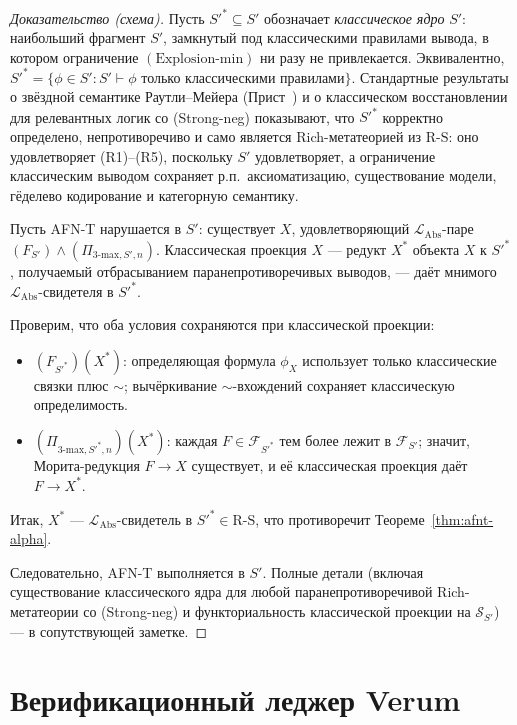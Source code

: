 \documentclass[11pt]{article}
\theoremstyle{plain}
\theoremstyle{definition}
\newcommand{\RS}{\mathrm{R\text{-}S}}
\newcommand{\cS}{\mathcal{S}}
\newcommand{\cF}{\mathcal{F}}
\newcommand{\LAbs}{\mathcal{L}_{\mathrm{Abs}}}
\begin{document}
\begin{proof}[Доказательство (схема)]

Пусть $S'^* \subseteq S'$ обозначает \emph{классическое ядро} $S'$: наибольший фрагмент $S'$, замкнутый под классическими правилами вывода, в котором ограничение $(\text{Explosion-min})$ ни разу не привлекается. Эквивалентно, $S'^* = \{\phi \in S' : S' \vdash \phi \text{ только классическими правилами}\}$. Стандартные результаты о звёздной семантике Раутли--Мейера (Прист~\cite{Priest2006}) и о классическом восстановлении для релевантных логик со (Strong-neg) показывают, что $S'^*$ корректно определено, непротиворечиво и само является Rich-метатеорией из $\RS$: оно удовлетворяет (R1)--(R5), поскольку $S'$ удовлетворяет, а ограничение классическим выводом сохраняет р.п.\ аксиоматизацию, существование модели, гёделево кодирование и категорную семантику.

Пусть AFN-T нарушается в $S'$: существует $X$, удовлетворяющий $\LAbs$-паре $(F_{S'}) \wedge (\Pi_{3\text{-max}, S', n})$. Классическая проекция $X$ --- редукт $X^*$ объекта $X$ к $S'^*$, получаемый отбрасыванием паранепротиворечивых выводов, --- даёт мнимого $\LAbs$-свидетеля в $S'^*$.

Проверим, что оба условия сохраняются при классической проекции:
\begin{itemize}
\item $(F_{S'^*})(X^*)$: определяющая формула $\phi_X$ использует только классические связки плюс $\sim$; вычёркивание $\sim$-вхождений сохраняет классическую определимость.
\item $(\Pi_{3\text{-max}, S'^*, n})(X^*)$: каждая $F \in \cF_{S'^*}$ тем более лежит в $\cF_{S'}$; значит, Морита-редукция $F \to X$ существует, и её классическая проекция даёт $F \to X^*$.
\end{itemize}

Итак, $X^*$ — $\LAbs$-свидетель в $S'^* \in \RS$, что противоречит Теореме~\ref{thm:afnt-alpha}.

Следовательно, AFN-T выполняется в $S'$. Полные детали (включая существование классического ядра для любой паранепротиворечивой Rich-метатеории со (Strong-neg) и функториальность классической проекции на $\cS_{S'}$) — в сопутствующей заметке.
\end{proof}

\section{Верификационный леджер Verum}\label{app:verification-ledger}
\end{document}
